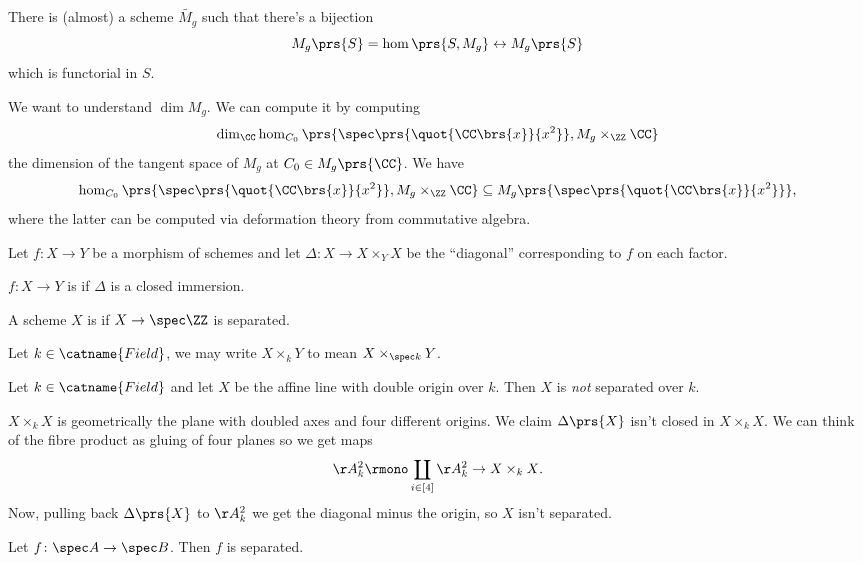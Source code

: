 \documentclass[10pt,a4paper,twoside,openany,hidelinks]{book}
\begin{document}
\begin{fact}
There is (almost) a scheme $\widetilde{M_g}$ such that there's a bijection
$$M_g\prs{S} = \hom\prs{S, M_g} \leftrightarrow M_g\prs{S}$$
which is functorial in $S$.
\end{fact}

\begin{remark}
We want to understand $\dim M_g$. We can compute it by computing $$\dim_{\CC} \hom_{C_0}\prs{\spec\prs{\quot{\CC\brs{x}}{x^2}}, M_g \times_{\ZZ} \CC}$$
the dimension of the tangent space of $M_g$ at $C_0 \in M_g\prs{\CC}$.
We have
$$\hom_{C_0}\prs{\spec\prs{\quot{\CC\brs{x}}{x^2}}, M_g \times_{\ZZ} \CC} \subseteq M_g\prs{\spec\prs{\quot{\CC\brs{x}}{x^2}}} \text{,}$$
where the latter can be computed via deformation theory from commutative algebra.
\end{remark}


Let $f \colon X \to Y$ be a morphism of schemes and let $\Delta \colon X \to X \times_Y X$ be the ``diagonal'' corresponding to $f$ on each factor.

\begin{definition}
$f \colon X \to Y$ is  if $\Delta$ is a closed immersion.
\end{definition}

\begin{definition}
A scheme $X$ is  if $X \to \spec \ZZ$ is separated.
\end{definition}

\begin{notation}
Let $k \in \catname{Field}$, we may write $X \times_k Y$ to mean $X \times_{\spec k} Y$.
\end{notation}

\begin{example}
Let $k \in \catname{Field}$ and let $X$ be the affine line with double origin over $k$.
Then $X$ is \emph{not} separated over $k$.

$X \times_k X$ is geometrically the plane with doubled axes and four different origins.
We claim $\Delta\prs{X}$ isn't closed in $X \times_k X$. We can think of the fibre product as gluing of four planes so we get maps
$$\AA_k^2 \rmono \coprod_{i \in [4]} \AA_k^2 \to X \times_k X \text{.}$$
Now, pulling back $\Delta\prs{X}$ to $\AA_k^2$ we get the diagonal minus the origin, so $X$ isn't separated.
\end{example}

\begin{proposition}
Let $f \colon \spec A \to \spec B$. Then $f$ is separated.
\end{proposition}
\end{document}

